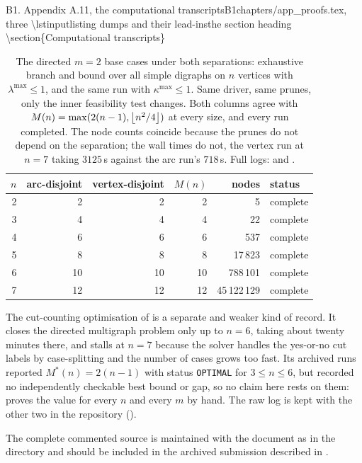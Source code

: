 \begin{offcutrewrite}{B1. Appendix A.11, the computational transcripts}{B1}{chapters/app\_proofs.tex, three \textbackslash{}lstinputlisting dumps and their lead-ins}{the section heading \textbackslash{}section\{Computational transcripts\}}
\begin{table}[ht]
  \centering
  \small
  \begin{tabular}{@{}rrrrrl@{}}
    \toprule
    $n$ & arc-disjoint & vertex-disjoint & $M(n)$ & nodes & status \\
    \midrule
    2 & 2 & 2 & 2 & 5 & complete \\
    3 & 4 & 4 & 4 & 22 & complete \\
    4 & 6 & 6 & 6 & 537 & complete \\
    5 & 8 & 8 & 8 & 17\,823 & complete \\
    6 & 10 & 10 & 10 & 788\,101 & complete \\
    7 & 12 & 12 & 12 & 45\,122\,129 & complete \\
    \bottomrule
  \end{tabular}
  \caption{The directed $m = 2$ base cases under both separations: exhaustive
  branch and bound over all simple digraphs on $n$ vertices with
  $\lambda^{\max} \le 1$, and the same run with $\kappa^{\max} \le 1$. Same
  driver, same prunes, only the inner feasibility test changes. Both columns
  agree with $M(n) = \max(2(n-1), \left\lfloor n^2/4 \right\rfloor)$ at every size, and every run
  completed. The node counts coincide because the prunes do not depend on the
  separation; the wall times do not, the vertex run at $n = 7$ taking
  $3125$\,s against the arc run's $718$\,s. Full logs:
   and
  .}
\end{table}

The cut-counting optimisation of  is a separate and weaker kind of record. It closes the directed multigraph problem only up to $n = 6$, taking about twenty minutes there, and stalls at $n = 7$ because the solver handles the yes-or-no cut labels by case-splitting and the number of cases grows too fast. Its archived runs reported $M^{*}(n) = 2(n-1)$ with status \texttt{OPTIMAL} for $3 \le n \le 6$, but recorded no independently checkable best bound or gap, so no claim here rests on them:  proves the value for every $n$ and every $m$ by hand. The raw log is kept with the other two in the repository ().

The complete commented source is maintained with the document as  in the  directory and should be included in the archived submission described in .
\end{offcutrewrite}


